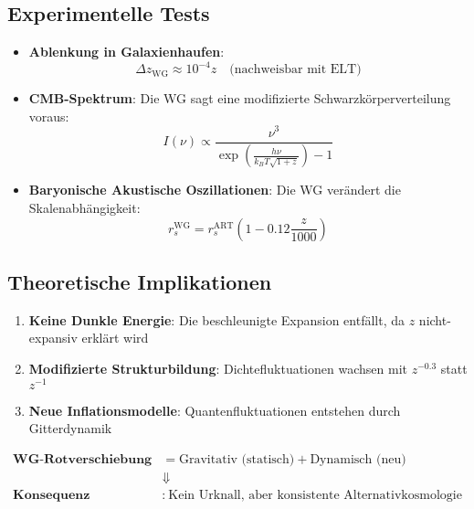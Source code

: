 \subsection{Experimentelle Tests}
\begin{itemize}
\item \textbf{Ablenkung in Galaxienhaufen}:
  \begin{equation}
  \Delta z_\text{WG} \approx 10^{-4}z \quad \text{(nachweisbar mit ELT)}
  \end{equation}

\item \textbf{CMB-Spektrum}:
  Die WG sagt eine modifizierte Schwarzkörperverteilung voraus:
  \begin{equation}
  I(\nu) \propto \frac{\nu^3}{\exp\left(\frac{h\nu}{k_B T\sqrt{1+z}}\right)-1}
  \end{equation}

\item \textbf{Baryonische Akustische Oszillationen}:
  Die WG verändert die Skalenabhängigkeit:
  \begin{equation}
  r_s^\text{WG} = r_s^\text{ART}\left(1 - 0.12\frac{z}{1000}\right)
  \end{equation}
\end{itemize}

\subsection{Theoretische Implikationen}
\begin{enumerate}
\item \textbf{Keine Dunkle Energie}: Die beschleunigte Expansion entfällt, da $z$ nicht-expansiv erklärt wird
\item \textbf{Modifizierte Strukturbildung}: Dichtefluktuationen wachsen mit $z^{-0.3}$ statt $z^{-1}$
\item \textbf{Neue Inflationsmodelle}: Quantenfluktuationen entstehen durch Gitterdynamik
\end{enumerate}

\begin{equation}
\boxed{
\begin{aligned}
\textbf{WG-Rotverschiebung} &= \text{Gravitativ (statisch)} + \text{Dynamisch (neu)} \\
&\Downarrow \\
\textbf{Konsequenz} &:\ \text{Kein Urknall, aber konsistente Alternativkosmologie}
\end{aligned}
}
\end{equation}
